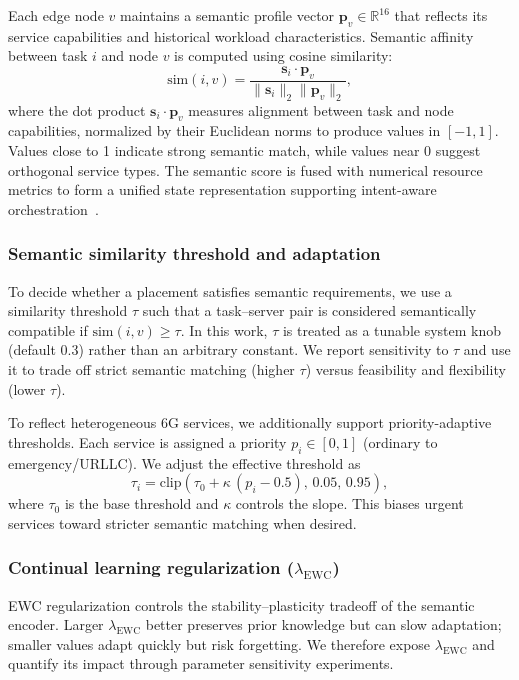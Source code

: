 \documentclass[conference]{IEEEtran}
\begin{document}
	Each edge node $v$ maintains a semantic profile vector $\mathbf{p}_v \in \mathbb{R}^{16}$ that reflects its service capabilities and historical workload characteristics. Semantic affinity between task $i$ and node $v$ is computed using cosine similarity:
	\begin{equation}
		\text{sim}(i,v) = \frac{\mathbf{s}_i \cdot \mathbf{p}_v}{\|\mathbf{s}_i\|_2 \|\mathbf{p}_v\|_2},
	\end{equation}
	where the dot product $\mathbf{s}_i \cdot \mathbf{p}_v$ measures alignment between task and node capabilities, normalized by their Euclidean norms to produce values in $[-1, 1]$. Values close to 1 indicate strong semantic match, while values near 0 suggest orthogonal service types. The semantic score is fused with numerical resource metrics to form a unified state representation supporting intent-aware orchestration~\cite{grasso2022hhome}.
	
	\subsubsection{Semantic similarity threshold and adaptation}
	To decide whether a placement satisfies semantic requirements, we use a similarity threshold $\tau$ such that a task--server pair is considered semantically compatible if $\mathrm{sim}(i,v)\ge\tau$. In this work, $\tau$ is treated as a tunable system knob (default $0.3$) rather than an arbitrary constant. We report sensitivity to $\tau$ and use it to trade off strict semantic matching (higher $\tau$) versus feasibility and flexibility (lower $\tau$).
	
	To reflect heterogeneous 6G services, we additionally support priority-adaptive thresholds. Each service is assigned a priority $p_i\in[0,1]$ (ordinary to emergency/URLLC). We adjust the effective threshold as
	\begin{equation}
	\tau_i = \mathrm{clip}(\tau_0 + \kappa\,(p_i-0.5),\,0.05,\,0.95),
	\end{equation}
	where $\tau_0$ is the base threshold and $\kappa$ controls the slope. This biases urgent services toward stricter semantic matching when desired.

	\subsubsection{Continual learning regularization ($\lambda_{\mathrm{EWC}}$)}
	EWC regularization controls the stability--plasticity tradeoff of the semantic encoder. Larger $\lambda_{\mathrm{EWC}}$ better preserves prior knowledge but can slow adaptation; smaller values adapt quickly but risk forgetting. We therefore expose $\lambda_{\mathrm{EWC}}$ and quantify its impact through parameter sensitivity experiments.
	
\end{document}
